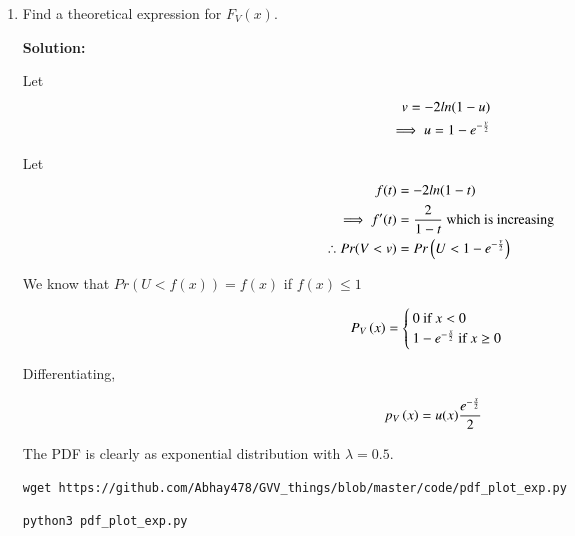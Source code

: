 \documentclass[journal,12pt,twocolumn]{IEEEtran}
\renewcommand\thesection{\arabic{section}}
\providecommand{\brak}[1]{\ensuremath{\left(#1\right)}}
\theoremstyle{remark}
\newcommand{\solution}{\noindent \textbf{Solution: }}
\numberwithin{equation}{section}
\numberwithin{equation}{section}
\begin{document}
\begin{enumerate}[label=\thesection.\arabic*,ref=\thesection.\theenumi]
\item Find a theoretical expression for $F_V(x)$.

\solution

Let
\begin{align}
    v = -2ln(1 - u) \nonumber \\
    \implies u = 1 - \e{-\frac{v}{2}} \label{exp-cdf}
\end{align}

Let
\begin{align}
    f(t) &= -2ln(1 - t) \label{Vfunc} \\
    \implies f'(t) &= \frac{2}{1 - t} \text{ which is increasing}\\
    \therefore Pr(V < v) &= Pr\brak{U < 1 - \e{-\frac{v}{2}}} \nonumber \\
\end{align}

We know that $Pr(U < f(x)) = f(x)$ if $f(x) \leq 1$ 

\begin{align}
    \cdf{x}{V} &= 
    \begin{cases}
        0 \text{ if } x < 0 \\
        1 - \e{-\frac{x}{2}} \text{ if } x \geq 0\\
    \end{cases}
\end{align}


Differentiating,

\begin{align}
    \pdf{x}{V} &= u(x)\frac{\e{-\frac{x}{2}}}{2} \label{exp-pdf}
\end{align}

The PDF is clearly as exponential distribution with $\lambda = 0.5$.
\begin{lstlisting}
wget https://github.com/Abhay478/GVV_things/blob/master/code/pdf_plot_exp.py
\end{lstlisting}
    
\begin{lstlisting}
python3 pdf_plot_exp.py
\end{lstlisting}


\end{enumerate}
\end{document}
